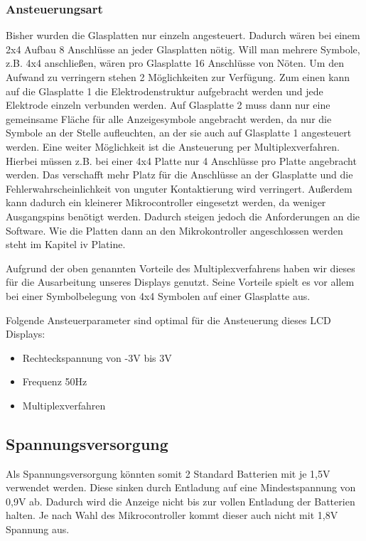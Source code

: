 \subsubsection{Ansteuerungsart}
Bisher wurden die Glasplatten nur einzeln angesteuert. Dadurch wären bei einem 2x4 Aufbau 8 Anschlüsse an jeder Glasplatten nötig. Will man mehrere Symbole, z.B. 4x4 anschließen, wären pro Glasplatte 16 Anschlüsse von Nöten. Um den Aufwand zu verringern stehen 2 Möglichkeiten zur Verfügung.
Zum einen kann auf die Glasplatte 1 die Elektrodenstruktur aufgebracht werden und jede Elektrode einzeln verbunden werden. Auf Glasplatte 2 muss dann nur eine gemeinsame Fläche für alle Anzeigesymbole angebracht werden, da nur die Symbole an der Stelle aufleuchten, an der sie auch auf Glasplatte 1 angesteuert werden.
Eine weiter Möglichkeit ist die Ansteuerung per Multiplexverfahren. Hierbei müssen z.B. bei einer 4x4 Platte nur 4 Anschlüsse pro Platte angebracht werden. Das verschafft mehr Platz für die Anschlüsse an der Glasplatte und die Fehlerwahrscheinlichkeit von unguter Kontaktierung wird verringert. Außerdem kann dadurch ein kleinerer Mikrocontroller eingesetzt werden, da weniger Ausgangspins benötigt werden. Dadurch steigen jedoch die Anforderungen an die Software. Wie die Platten dann an den Mikrokontroller angeschlossen werden steht im Kapitel iv Platine.

Aufgrund der oben genannten Vorteile des Multiplexverfahrens haben wir dieses für die Ausarbeitung unseres Displays genutzt. Seine Vorteile spielt es vor allem bei einer Symbolbelegung von 4x4 Symbolen auf einer Glasplatte aus.

Folgende Ansteuerparameter sind optimal für die Ansteuerung dieses LCD Displays:
\begin{itemize}
\item Rechteckspannung von -3V bis 3V
\item Frequenz 50Hz
\item Multiplexverfahren
\end{itemize}

\subsection{Spannungsversorgung}
Als Spannungsversorgung könnten somit 2 Standard Batterien mit je 1,5V verwendet werden. Diese sinken durch Entladung auf eine Mindestspannung von 0,9V ab. Dadurch wird die Anzeige nicht bis zur vollen Entladung der Batterien halten. Je nach Wahl des Mikrocontroller kommt dieser auch nicht mit 1,8V Spannung aus.


